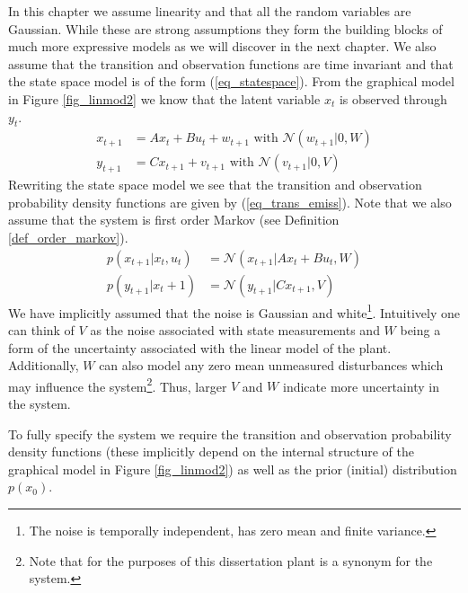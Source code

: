 In this chapter we assume linearity and that all the random variables are Gaussian. While these are strong assumptions they form the building blocks of much more expressive models as we will discover in the next chapter. We also assume that the transition and observation functions are time invariant and that the state space model is of the form (\ref{eq_statespace}). From the graphical model in Figure \ref{fig_linmod2} we know that the latent variable $x_t$ is observed through $y_t$.
\begin{equation}
\begin{aligned}
x_{t+1} &= Ax_t + Bu_t + w_{t+1} \text{ with } \mathcal{N}(w_{t+1}|0,W) \\
y_{t+1} &= Cx_{t+1} + v_{t+1}  \text{ with } \mathcal{N}(v_{t+1}|0,V)
\end{aligned}
\label{eq_statespace}
\end{equation}
Rewriting the state space model we see that the transition and observation probability density functions are given by (\ref{eq_trans_emiss}). Note that we also assume that the system is first order Markov (see Definition \ref{def_order_markov}).
\begin{equation}
\begin{aligned}
p(x_{t+1}|x_t, u_t)&= \mathcal{N}(x_{t+1}|Ax_t+Bu_t, W) \\
p(y_{t+1}|x_t+1) &= \mathcal{N}(y_{t+1}|Cx_{t+1}, V)
\end{aligned}
\label{eq_trans_emiss}
\end{equation}
We have implicitly assumed that the noise is Gaussian and white\footnote{The noise is temporally independent, has zero mean and finite variance.}. Intuitively one can think of $V$ as the noise associated with state measurements and $W$ being a form of the uncertainty associated with the linear model of the plant. Additionally, $W$ can also model any zero mean unmeasured disturbances which may influence the system\footnote{Note that for the purposes of this dissertation plant is a synonym for the system.}. Thus, larger $V$ and $W$ indicate more uncertainty in the system. 

To fully specify the system we require the transition and observation probability density functions (these implicitly depend on the internal structure of the graphical model in Figure \ref{fig_linmod2}) as well as the prior (initial) distribution $p(x_0)$.

